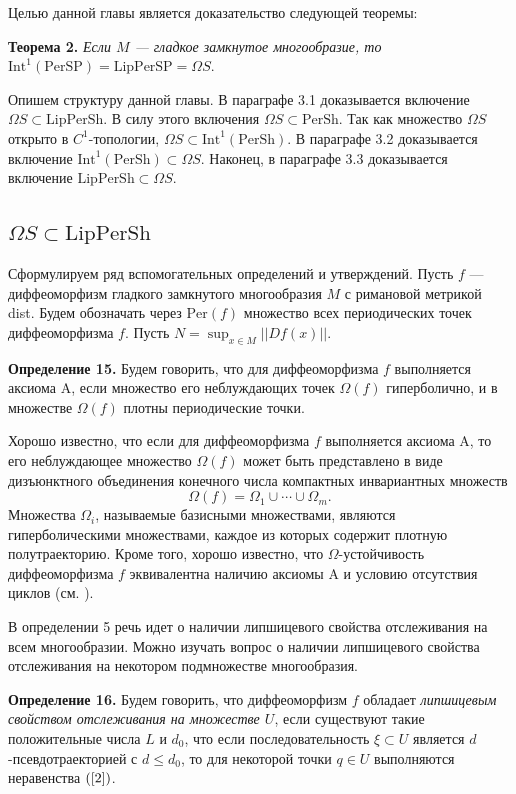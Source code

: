 \documentclass[12pt]{article}
\begin{document}
Целью данной главы является доказательство следующей теоремы:

\textbf{Теорема 2.} \textit{Если $M$ --- гладкое замкнутое многообразие, то} 
$\mbox{Int}^1(\mbox{PerSP})=\mbox{LipPerSP}=\Omega S.$

Опишем структуру данной главы. В параграфе 3.1 доказывается включение $\Omega S\subset\mbox{LipPerSh}$. В силу этого включения $\Omega S\subset\mbox{PerSh}$. Так как множество $\Omega S$ открыто в $C^1$-топологии, $\Omega S\subset\mbox{Int}^1(\mbox{PerSh})$. В параграфе 3.2 доказывается включение $\mbox{Int}^1(\mbox{PerSh})\subset\Omega S$. Наконец, в параграфе 3.3 доказывается включение $\mbox{LipPerSh}\subset\Omega S$.
  
\subsection{$\Omega S\subset\mbox{LipPerSh}$}  
  
Сформулируем ряд вспомогательных определений и утверждений. Пусть $f$ --- диффеоморфизм гладкого замкнутого многообразия $M$ с римановой метрикой dist. Будем обозначать через $\mbox{Per}(f)$ множество всех периодических точек диффеоморфизма $f$. Пусть $N=\sup_{x\in M}||Df(x)||$.
 
\textbf{Определение 15.}  
Будем говорить, что для диффеоморфизма $f$ выполняется аксиома A, если множество его неблуждающих точек $\Omega(f)$ гиперболично, и в множестве $\Omega(f)$ плотны периодические точки.  
  
Хорошо известно, что если для диффеоморфизма $f$ выполняется аксиома A, то его неблуждающее множество $\Omega(f)$ может быть представлено в виде дизъюнктного объединения конечного числа компактных инвариантных множеств
\begin{equation}
\label{3.1.1}
\Omega(f)=\Omega_1\cup\cdots\cup\Omega_m.
\end{equation}
Множества $\Omega_i$, называемые базисными множествами, являются гиперболическими множествами, каждое из которых содержит плотную полутраекторию. Кроме того, хорошо известно, что $\Omega$-устойчивость диффеоморфизма $f$ эквивалентна наличию аксиомы A и условию отсутствия циклов (см. \cite{P2}).

В определении 5 речь идет о наличии липшицевого свойства отслеживания на всем многообразии. Можно изучать вопрос о наличии липшицевого свойства отслеживания на некотором подмножестве многообразия.

\textbf{Определение 16.} Будем говорить, что диффеоморфизм $f$ обладает \textit{липшицевым свойством отслеживания на множестве $U$}, если существуют такие положительные числа $L$ и $d_0$, что если последовательность $\xi\subset U$ является $d$-псевдотраекторией с $d\leq d_0$, то для некоторой точки $q\in U$ выполняются неравенства $(\ref{2})$.
\end{document}
